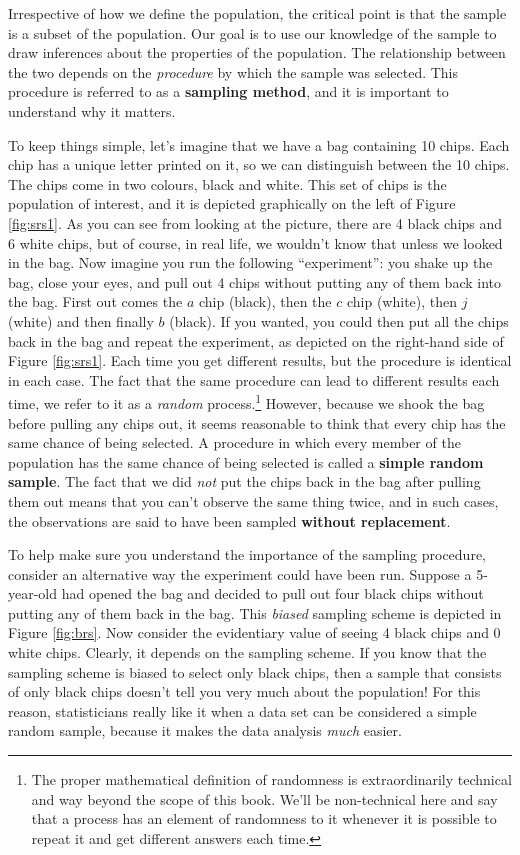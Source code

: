 \documentclass[
]{book}
\theoremstyle{definition}
\theoremstyle{definition}
\theoremstyle{definition}
\theoremstyle{definition}
\theoremstyle{remark}
\begin{document}
Irrespective of how we define the population, the critical point is that the sample is a subset of the population. Our goal is to use our knowledge of the sample to draw inferences about the properties of the population. The relationship between the two depends on the \emph{procedure} by which the sample was selected. This procedure is referred to as a \textbf{sampling method}, and it is important to understand why it matters.

To keep things simple, let's imagine that we have a bag containing 10 chips. Each chip has a unique letter printed on it, so we can distinguish between the 10 chips. The chips come in two colours, black and white. This set of chips is the population of interest, and it is depicted graphically on the left of Figure \ref{fig:srs1}. As you can see from looking at the picture, there are 4 black chips and 6 white chips, but of course, in real life, we wouldn't know that unless we looked in the bag. Now imagine you run the following ``experiment'': you shake up the bag, close your eyes, and pull out 4 chips without putting any of them back into the bag. First out comes the \(a\) chip (black), then the \(c\) chip (white), then \(j\) (white) and then finally \(b\) (black). If you wanted, you could then put all the chips back in the bag and repeat the experiment, as depicted on the right-hand side of Figure \ref{fig:srs1}. Each time you get different results, but the procedure is identical in each case. The fact that the same procedure can lead to different results each time, we refer to it as a \emph{random} process.\footnote{The proper mathematical definition of randomness is extraordinarily technical and way beyond the scope of this book. We'll be non-technical here and say that a process has an element of randomness to it whenever it is possible to repeat it and get different answers each time.} However, because we shook the bag before pulling any chips out, it seems reasonable to think that every chip has the same chance of being selected. A procedure in which every member of the population has the same chance of being selected is called a \textbf{simple random sample}. The fact that we did \emph{not} put the chips back in the bag after pulling them out means that you can't observe the same thing twice, and in such cases, the observations are said to have been sampled \textbf{without replacement}.

To help make sure you understand the importance of the sampling procedure, consider an alternative way the experiment could have been run. Suppose a 5-year-old had opened the bag and decided to pull out four black chips without putting any of them back in the bag. This \emph{biased} sampling scheme is depicted in Figure \ref{fig:brs}. Now consider the evidentiary value of seeing 4 black chips and 0 white chips. Clearly, it depends on the sampling scheme. If you know that the sampling scheme is biased to select only black chips, then a sample that consists of only black chips doesn't tell you very much about the population! For this reason, statisticians really like it when a data set can be considered a simple random sample, because it makes the data analysis \emph{much} easier.
\end{document}
